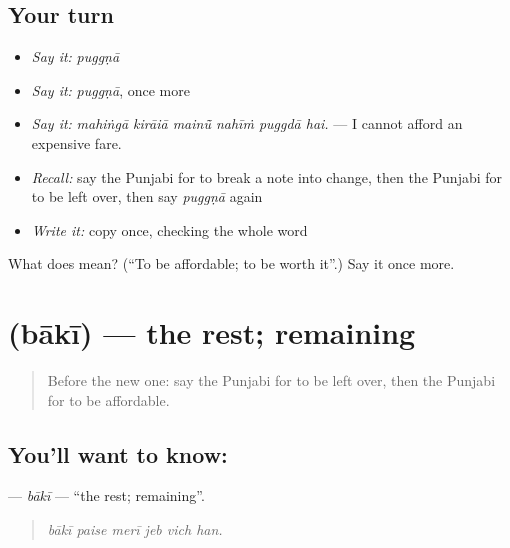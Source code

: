 \subsection*{Your turn}
\begin{itemize}
\raggedright
  \item \emph{Say it:} \emph{puggṇā}
  \item \emph{Say it:} \emph{puggṇā}, once more
  \item \emph{Say it:} \emph{mahiṅgā kirāiā mainū̃ nahīṁ puggdā hai.} — I cannot afford an expensive fare.
  \item \emph{Recall:} say the Punjabi for to break a note into change, then the Punjabi for to be left over, then say \emph{puggṇā} again
  \item \emph{Write it:} copy \textbf{} once, checking the whole word
\end{itemize}

\begin{tcolorbox}[breakable,colback=teal!4,colframe=teal!35!black,title={Before you move on}]
What does  mean? (\textquotedblleft{}To be affordable; to be worth it\textquotedblright{}.) Say it once more.
\end{tcolorbox}
\section[\texorpdfstring{\pa{ਬਾਕੀ} (bākī)}{ਬਾਕੀ (bākī)}]{ (bākī) — the rest; remaining}

\label{lesson:PA-C280-baki}



\begin{quote}
Before the new one: say the Punjabi for to be left over, then the Punjabi for to be affordable.
\end{quote}

\subsection*{You'll want to know: }
\textbf{} — \emph{bākī} — \textquotedblleft{}the rest; remaining\textquotedblright{}.

\begin{quote}
     
\end{quote}

\begin{quote}
\emph{bākī paise merī jeb vich han.}
\end{quote}

